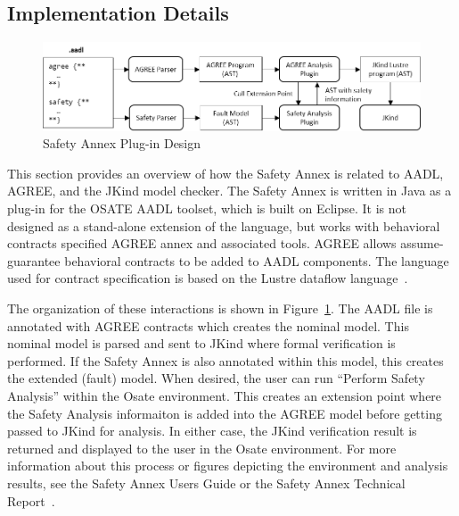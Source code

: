 \subsection{Implementation Details}

\begin{figure}[h!]
\begin{center}
\includegraphics[width=.9\textwidth]{images/arch.png}
\vspace{0.1in}
\caption{Safety Annex Plug-in Design}
\label{fig:plugin-arch}
\end{center}
\end{figure}

This section provides an overview of how the Safety Annex is related to AADL, AGREE, and the JKind model checker.  The Safety Annex is written in Java as a plug-in for the OSATE AADL toolset, which is built on Eclipse.  It is not designed as a stand-alone extension of the language, but works with behavioral contracts specified AGREE annex and associated tools.  AGREE allows assume-guarantee behavioral contracts to be added to AADL components.  The language used for contract specification is based on the Lustre dataflow language~\cite{Halbwachs91:IEEE}. 

The organization of these interactions  is shown in Figure~\ref{fig:plugin-arch}. The AADL file is annotated with AGREE contracts which creates the nominal model. This nominal model is parsed and sent to JKind where formal verification is performed. If the Safety Annex is also annotated within this model, this creates the extended (fault) model. When desired, the user can run ``Perform Safety Analysis'' within the Osate environment. This creates an extension point where the Safety Analysis informaiton is added into the AGREE model before getting passed to JKind for analysis. In either case, the JKind verification result is returned and displayed to the user in the Osate environment. For more information about this process or figures depicting the environment and analysis results, see the Safety Annex Users Guide or the Safety Annex Technical Report~\cite{amaseRepo, SATechReport}.



